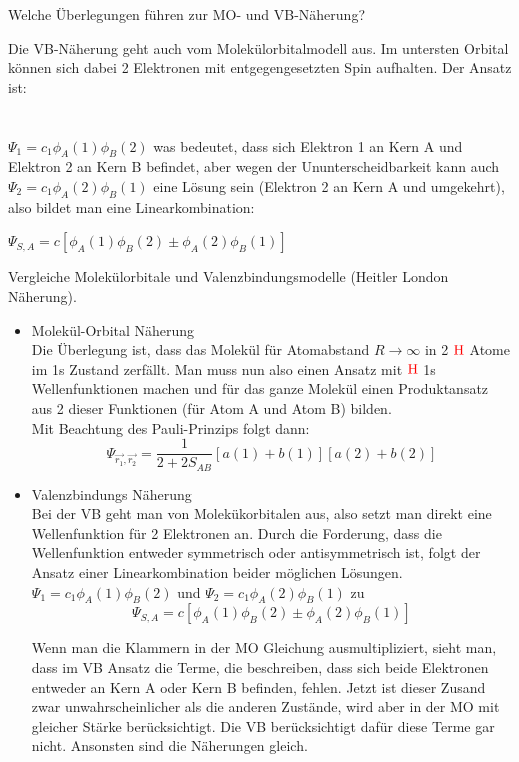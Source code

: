 \documentclass[a5paper,12pt,ngerman,grid=front %
,print
]{kartei}
\let\oldce\ce
\renewcommand*{\ce}[1]{\begingroup\color{red}\oldce{#1}\endgroup}
\begin{document}
\begin{karte}{
		Welche Überlegungen führen zur MO- und VB-Näherung?
		}
\begin{itemize}
		Die VB-Näherung geht auch vom Molekülorbitalmodell aus. 
		Im untersten Orbital können sich dabei 2 Elektronen mit entgegengesetzten Spin aufhalten. 
		Der Ansatz ist: \\ \\ \\
		$\Psi_1 = c_1 \phi_A(1) \phi_B(2)$ 
		was bedeutet, dass sich Elektron 1 an Kern A und Elektron 2 an Kern B befindet, 
		aber wegen der Ununterscheidbarkeit kann auch 
		$\Psi_2 = c_1 \phi_A(2) \phi_B(1)$
		eine Lösung sein (Elektron 2 an Kern A und umgekehrt), also bildet man eine Linearkombination:
		 
		$\Psi_{S,A} = c[ \phi_A(1) \phi_B(2) \pm \phi_A(2) \phi_B(1) ] $ 
			 
			
		\end{itemize}
		
	\end{karte}
		
		
	\begin{karte}{
		Vergleiche Molekülorbitale und Valenzbindungsmodelle (Heitler London Näherung).
		}
		
		\begin{itemize}
			\item Molekül-Orbital Näherung \\
			
			Die Überlegung ist, dass das Molekül für Atomabstand $R \rightarrow \infty$ in 2 
			$\ce{H}$ Atome im 1s Zustand zerfällt. 
			Man muss nun also einen Ansatz mit $\ce{H}$ 1s Wellenfunktionen machen und für 
			das ganze Molekül einen Produktansatz aus 2 dieser Funktionen 
			(für Atom A und Atom B) bilden. \\
			Mit Beachtung des Pauli-Prinzips folgt dann:
			$$\Psi_{\overrightarrow{r_1},\overrightarrow{r_2}} = 
			\frac{1}{2+2S_{AB}}[a(1)+b(1)][a(2)+b(2)]$$
			
			\item Valenzbindungs Näherung \\
			 
			 Bei der VB geht man von Molekükorbitalen aus, also setzt man direkt eine Wellenfunktion für 2 Elektronen an. Durch die Forderung, dass die Wellenfunktion entweder symmetrisch oder antisymmetrisch ist, folgt der Ansatz einer Linearkombination beider möglichen Lösungen.
			 $ \Psi_1 = c_1\phi_A(1)\phi_B(2) $ und $ \Psi_2 = c_1\phi_A(2)\phi_B(1) $ zu
			 $$  \Psi_{S,A} = c \left[   \phi_A(1) \phi_B(2) \pm   \phi_A(2) \phi_B(1)   \right]  $$
			 
			 Wenn man die Klammern in der MO Gleichung ausmultipliziert, sieht man, dass im VB Ansatz die Terme, die beschreiben, dass sich beide Elektronen entweder an Kern A oder Kern B befinden, fehlen.
			 Jetzt ist dieser Zusand zwar unwahrscheinlicher als die anderen Zustände, wird aber in der MO mit gleicher Stärke berücksichtigt. Die VB berücksichtigt dafür diese Terme gar nicht.
			 Ansonsten sind die Näherungen gleich.
			
		\end{itemize}
		
	\end{karte}
	
\end{document}
